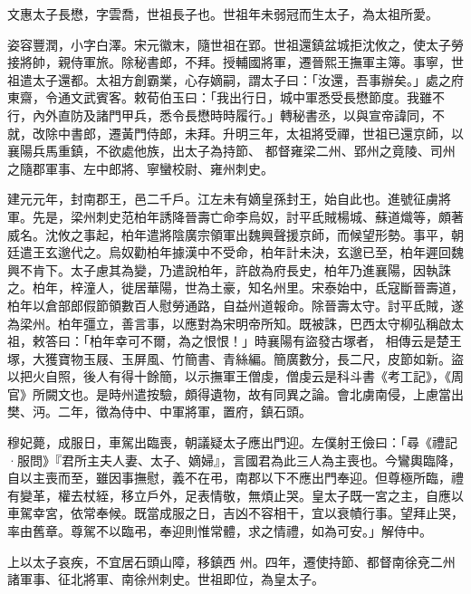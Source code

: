 
\begin{pinyinscope}

 文惠太子長懋，字雲喬，世祖長子也。世祖年未弱冠而生太子，為太祖所愛。



 姿容豐潤，小字白澤。宋元徽末，隨世祖在郢。世祖還鎮盆城拒沈攸之，使太子勞接將帥，親侍軍旅。除秘書郎，不拜。授輔國將軍，遷晉熙王撫軍主簿。事寧，世祖遣太子還都。太祖方創霸業，心存嫡嗣，謂太子曰：「汝還，吾事辦矣。」處之府東齋，令通文武賓客。敕荀伯玉曰：「我出行日，城中軍悉受長懋節度。我雖不行，內外直防及諸門甲兵，悉令長懋時時履行。」轉秘書丞，以與宣帝諱同，不就，改除中書郎，遷黃門侍郎，未拜。升明三年，太祖將受禪，世祖已還京師，以襄陽兵馬重鎮，不欲處他族，出太子為持節、
 都督雍梁二州、郢州之竟陵、司州之隨郡軍事、左中郎將、寧蠻校尉、雍州刺史。



 建元元年，封南郡王，邑二千戶。江左未有嫡皇孫封王，始自此也。進號征虜將軍。先是，梁州刺史范柏年誘降晉壽亡命李烏奴，討平氐賊楊城、蘇道熾等，頗著威名。沈攸之事起，柏年遣將陰廣宗領軍出魏興聲援京師，而候望形勢。事平，朝廷遣王玄邈代之。烏奴勸柏年據漢中不受命，柏年計未決，玄邈已至，柏年遲回魏興不肯下。太子慮其為變，乃遣說柏年，許啟為府長史，柏年乃進襄陽，因執誅之。柏年，梓潼人，徙居華陽，世為土豪，知名州里。宋泰始中，氐寇斷晉壽道，柏年以倉部郎假節領數百人慰勞通路，自益州道報命。除晉壽太守。討平氐賊，遂為梁州。柏年彊立，善言事，以應對為宋明帝所知。既被誅，巴西太守柳弘稱啟太祖，敕答曰：「柏年幸可不爾，為之恨恨！」時襄陽有盜發古塚者，
 相傳云是楚王塚，大獲寶物玉屐、玉屏風、竹簡書、青絲編。簡廣數分，長二尺，皮節如新。盜以把火自照，後人有得十餘簡，以示撫軍王僧虔，僧虔云是科斗書《考工記》，《周官》所闕文也。是時州遣按驗，頗得遺物，故有同異之論。會北虜南侵，上慮當出樊、沔。二年，徵為侍中、中軍將軍，置府，鎮石頭。



 穆妃薨，成服日，車駕出臨喪，朝議疑太子應出門迎。左僕射王儉曰：「尋《禮記·服問》『君所主夫人妻、太子、嫡婦』，言國君為此三人為主喪也。今鸞輿臨降，自以主喪而至，雖因事撫慰，義不在弔，南郡以下不應出門奉迎。但尊極所臨，禮有變革，權去杖絰，移立戶外，足表情敬，無煩止哭。皇太子既一宮之主，自應以車駕幸宮，依常奉候。既當成服之日，吉凶不容相干，宜以衰幘行事。望拜止哭，率由舊章。尊駕不以臨弔，奉迎則惟常體，求之情禮，如為可安。」解侍中。



 上以太子哀疾，不宜居石頭山障，移鎮西
 州。四年，遷使持節、都督南徐兗二州諸軍事、征北將軍、南徐州刺史。世祖即位，為皇太子。




\end{pinyinscope}
